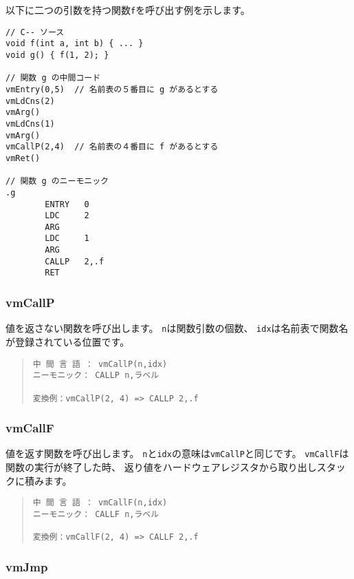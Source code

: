 以下に二つの引数を持つ関数\verb/f/を呼び出す例を示します。

\begin{mylist}
\begin{verbatim}
// C-- ソース
void f(int a, int b) { ... }
void g() { f(1, 2); }

// 関数 g の中間コード
vmEntry(0,5)  // 名前表の５番目に g があるとする
vmLdCns(2)
vmArg()
vmLdCns(1)
vmArg()
vmCallP(2,4)  // 名前表の４番目に f があるとする
vmRet()

// 関数 g のニーモニック
.g
        ENTRY   0
        LDC     2
        ARG
        LDC     1
        ARG
        CALLP   2,.f
        RET
\end{verbatim}
\end{mylist}

\subsubsection{vmCallP}

値を返さない関数を呼び出します。
\verb/n/は関数引数の個数、
\verb/idx/は名前表で関数名が登録されている位置です。

\begin{quote}
\begin{verbatim}
中 間 言 語 ： vmCallP(n,idx)
ニーモニック： CALLP n,ラベル

変換例：vmCallP(2, 4) => CALLP 2,.f
\end{verbatim}
\end{quote}

\subsubsection{vmCallF}

値を返す関数を呼び出します。
\verb/n/と\verb/idx/の意味は\verb/vmCallP/と同じです。
\verb/vmCallF/は関数の実行が終了した時、
返り値をハードウェアレジスタから取り出しスタックに積みます。

\begin{quote}
\begin{verbatim}
中 間 言 語 ： vmCallF(n,idx)
ニーモニック： CALLF n,ラベル

変換例：vmCallF(2, 4) => CALLF 2,.f
\end{verbatim}
\end{quote}

\subsubsection{vmJmp}

